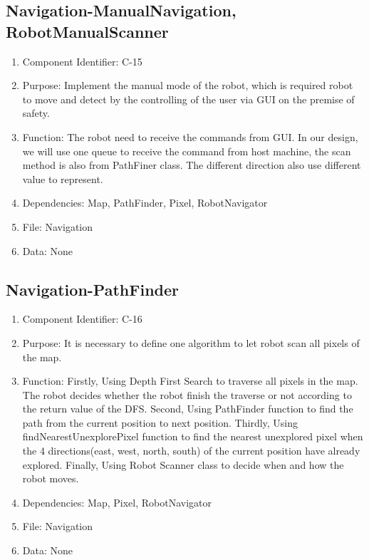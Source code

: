 \documentclass[11pt, a4paper]{report}
\begin{document}
\subsection{Navigation-ManualNavigation, RobotManualScanner}
\begin{enumerate}
\item Component Identifier: C-15
\item Purpose: Implement the manual mode of the robot, which is required robot to move and detect by the controlling of the user via GUI on the premise of safety.
\item Function: The robot need to receive the commands from GUI. In our design, we will use one queue to receive the command from host machine, the scan method is also from PathFiner class. The different direction also use different value to represent.
\item Dependencies: Map, PathFinder, Pixel, RobotNavigator
\item File: Navigation
\item Data: None
\end{enumerate}

\subsection{Navigation-PathFinder}
\begin{enumerate}
\item Component Identifier: C-16
\item Purpose: It is necessary to define one algorithm to let robot scan all pixels of the map.
\item Function: Firstly, Using Depth First Search to traverse all pixels in the map. The robot decides whether the robot finish the traverse or not according to the return value of the DFS. Second, Using PathFinder function to find the path from the current position to next position. Thirdly, Using findNearestUnexplorePixel function to find the nearest unexplored pixel when the 4
directions(east, west, north, south) of the current position have already explored. Finally, Using Robot Scanner class to decide when and how the robot moves.
\item Dependencies: Map, Pixel, RobotNavigator
\item File: Navigation
\item Data: None
\end{enumerate}
\end{document}
